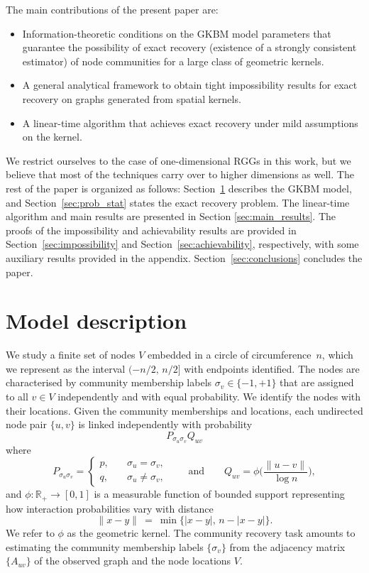 \documentclass[letterpaper,11pt]{article}
\theoremstyle{definition}
\def\R{\mathbb{R}}
\def\weq{ \ = \ }
\numberwithin{equation}{section}
\theoremstyle{definition}
\def\R{\mathbb{R}}
\def\weq{ \ = \ }
\numberwithin{equation}{section}
\theoremstyle{thmstyletwo}%
\begin{document}
The main contributions of the present paper are:
\begin{itemize}
\item
Information-theoretic conditions on the GKBM model parameters that guarantee the possibility of exact recovery (existence of a strongly consistent estimator) of node communities for a large class of geometric kernels.
\item
A general analytical framework to obtain tight impossibility results for exact recovery on graphs generated from spatial kernels.
\item
A linear-time algorithm that achieves exact recovery under mild assumptions on the kernel.
\end{itemize}
We restrict ourselves to the case of one-dimensional RGGs in this work, but we believe that most of the techniques carry over to higher dimensions as well. The rest of the paper is organized as follows: Section~\ref{sec:model} describes the GKBM model, and Section~\ref{sec:prob_stat} states the exact recovery problem. The linear-time algorithm and main results are presented in Section \ref{sec:main_results}. The proofs of the impossibility and achievability results are provided in Section~\ref{sec:impossibility} and Section~\ref{sec:achievability}, respectively, with some auxiliary results provided in the appendix. Section~\ref{sec:conclusions} concludes the paper.


\section{Model description}
\label{sec:model}

We study a finite set of nodes $V$ embedded in a circle of circumference~$n$, which we represent as the interval $(-n/2,\,n/2]$ with endpoints identified.
The nodes are characterised by community membership labels $\sigma_v \in \{-1,+1\}$ that are assigned to all $v\in V$ independently and with equal probability. We identify the nodes with their
locations.
Given the community memberships and locations, each undirected node pair
$\{u,v\}$ is linked independently with probability
\begin{equation}
\label{eq:InteractionProduct}
P_{\sigma_u \sigma_v} Q_{uv}
\end{equation}
where 
\begin{equation}
\label{eq:InteractionKernel}
P_{\sigma_u \sigma_v}
=
\begin{cases}
p, &\quad \sigma_u = \sigma_v, \\
q, &\quad \sigma_u \ne \sigma_v,
\end{cases}
\qquad \text{and} \qquad
Q_{uv}
= \phi\bigg( \frac{\| u - v \|}{\log n}\bigg),
\end{equation}
and
$\phi \colon \R_+ \to [0,1]$ is a measurable function of bounded support representing
how interaction probabilities vary with distance
\[
\|x-y\|
\weq \min \{|x-y|, \, n-|x-y|\}.
\]
We refer to $\phi$ as the geometric kernel. The community recovery task amounts to estimating the community membership labels $\{\sigma_v\}$
from the adjacency matrix $\{A_{uv}\}$ of the observed graph and the node locations $V$.
\end{document}
